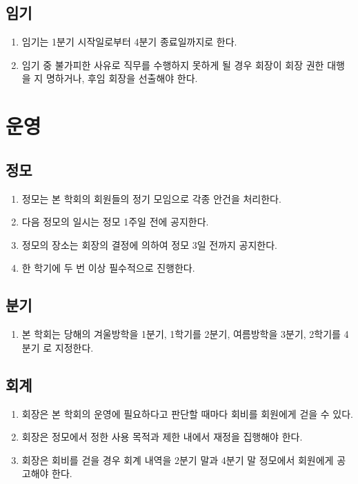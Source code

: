 \documentclass{oblivoir}
\begin{document}
\section{임기}
\begin{enumerate}
    \item  임기는 1분기 시작일로부터 4분기 종료일까지로 한다.
    \item  \label{president-must-appoint-the acting}임기 중 불가피한 사유로 직무를 수행하지 못하게 될 경우 회장이 회장 권한 대행을 지
          명하거나, 후임 회장을 선출해야 한다.
\end{enumerate}

\chapter{운영}

\section{정모}
\begin{enumerate}
    \item 정모는 본 학회의 회원들의 정기 모임으로 각종 안건을 처리한다.
    \item 다음 정모의 일시는 정모 1주일 전에 공지한다.
    \item 정모의 장소는 회장의 결정에 의하여 정모 3일 전까지 공지한다.
    \item 한 학기에 두 번 이상 필수적으로 진행한다.
\end{enumerate}

\section{분기}
\begin{enumerate}
    \item  본 학회는 당해의 겨울방학을 1분기, 1학기를 2분기, 여름방학을 3분기, 2학기를 4분기
          로 지정한다.
\end{enumerate}

\section{회계}
\begin{enumerate}
    \item  회장은 본 학회의 운영에 필요하다고 판단할 때마다 회비를 회원에게 걷을 수 있다.
    \item  회장은 정모에서 정한 사용 목적과 제한 내에서 재정을 집행해야 한다.
    \item  회장은 회비를 걷을 경우 회계 내역을 2분기 말과 4분기 말 정모에서 회원에게 공고해야 한다.
\end{enumerate}
\end{document}
